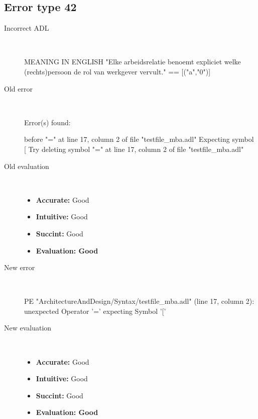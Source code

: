 \subsection{Error type 42}
  \begin{description}
  \item[Incorrect ADL]~\\
\begin{adl}
MEANING IN ENGLISH "Elke arbeidsrelatie benoemt expliciet welke (rechts)persoon de rol van werkgever vervult."
== [("a","0")]        \end{adl}
  \item[Old error]~\\
\begin{haskell}
Error(s) found:

before "=" at line 17, column 2 of file "testfile_mba.adl"
Expecting symbol [
Try deleting symbol "=" at line 17, column 2 of file "testfile_mba.adl"
\end{haskell}
  \item[Old evaluation]~\\
    \begin{itemize}
    \item \textbf{Accurate:} Good
    \item \textbf{Intuitive:} Good
    \item \textbf{Succint:} Good
    \item \textbf{Evaluation: Good}
    \end{itemize}
  \item[New error]~\\
\begin{haskell}
PE "ArchitectureAndDesign/Syntax/testfile_mba.adl" (line 17, column 2):
unexpected Operator '='
expecting Symbol '['\end{haskell}
  \item[New evaluation]~\\
    \begin{itemize}
    \item \textbf{Accurate:} Good
    \item \textbf{Intuitive:} Good
    \item \textbf{Succint:} Good
    \item \textbf{Evaluation: Good
}
    \end{itemize}
  \end{description}

\hrulefill

